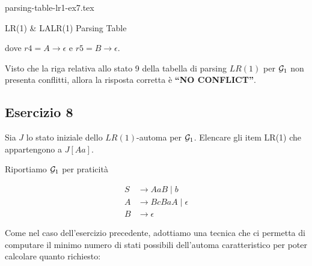 \documentclass[class=book, crop=false, oneside, 12pt]{standalone}
\begin{document}
\begin{table}[H]
    \centering
    {parsing-table-lr1-ex7.tex}
    \caption{LR(1) \& LALR(1) Parsing Table}
    \label{tab:parsing-table-lr1-ex7}
\end{table}
dove \(r4 =  A \to \epsilon\) e \(r5 =  B \to \epsilon\).

Visto che la riga relativa allo stato 9 della tabella di parsing \(LR(1)\) per \(\mathcal{G}_1\) non presenta conflitti, allora la risposta corretta è \textbf{“NO CONFLICT”}.

\subsection{Esercizio 8}

Sia \(J\) lo stato iniziale dello \(LR(1)\)-automa per \(\mathcal{G}_1\). Elencare gli item LR(1) che appartengono a \(J[Aa]\).

Riportiamo \(\mathcal{G}_1\) per praticità

\begin{align*}
    S &\to AaB \mid b \\
    A &\to BcBaA \mid \epsilon \\
    B &\to \epsilon
\end{align*}

Come nel caso dell'esercizio precedente, adottiamo una tecnica che ci permetta di computare il minimo numero di stati possibili dell'automa caratteristico per poter calcolare quanto richiesto:
\end{document}
